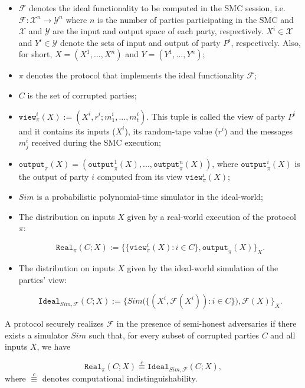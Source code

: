 \begin{itemize}
    \item $\mathcal{F}$ denotes the ideal functionality to be computed in the SMC session, i.e. $\mathcal{F}: \mathcal{X}^n \rightarrow \mathcal{Y}^n$ where $n$ is the number of parties participating in the SMC and $\mathcal{X}$ and $\mathcal{Y}$ are the input and output space of each party, respectively. $X^i\in \mathcal{X}$ and $Y^i\in \mathcal{Y}$ denote the sets of input and output of party $P^i$, respectively. Also, for short, $X = (X^1, ..., X^n)$ and $Y = (Y^1, ..., Y^n)$;
    \item $\pi$ denotes the protocol that implements the ideal functionality $\mathcal{F}$;
    \item $C$ is the set of corrupted parties;
    \item $\mathtt{view}^i_\pi(X) := (X^i, r^i; m_1^i,...,m_t^i)$. This tuple is called the view of party $P^i$ and it contains its inputs ($X^i$), its random-tape value ($r^i$) and the messages $m_j^i$ received during the SMC execution;
    \item $\mathtt{output}_\pi(X) = (\mathtt{output}^1_\pi(X), ..., \mathtt{output}^n_\pi(X))$, where $\mathtt{output}^i_\pi(X)$ is the output of party $i$ computed from its view $\mathtt{view}^i_\pi(X)$;
    \item $Sim$ is a probabilistic polynomial-time simulator in the ideal-world;
    \item The distribution on inputs $X$ given by a real-world execution of the protocol $\pi$:
    
    \begin{equation*}
    \mathtt{Real}_\pi(C; X):=\big\{\{ \mathtt{view}^i_\pi(X) : i\in C \}, \mathtt{output}_\pi(X) \big\}_{X}.
    \end{equation*}
    
    \item The distribution on inputs $X$ given by the ideal-world simulation of the parties' view: 
    
    \begin{equation*}
    \mathtt{Ideal}_{Sim,\mathcal{F}}(C; X):=\big\{ Sim\big(\{(X^i, \mathcal{F}(X^i)) : i\in C \}\big), \mathcal{F}(X) \big\}_X.
    \end{equation*}
\end{itemize}

\begin{definition}\label{def:security}
A protocol securely realizes $\mathcal{F}$ in the presence of semi-honest adversaries if there exists a simulator $Sim$ such that, for every subset of corrupted parties $C$ and all inputs $X$, we have

\begin{equation}
    \mathtt{Real}_\pi(C; X) \stackrel{c}{\equiv} \mathtt{Ideal}_{Sim, \mathcal{F}}(C; X),
    \label{eq:SH_security}
\end{equation}
where $\stackrel{c}{\equiv}$ denotes computational indistinguishability.

\end{definition}

